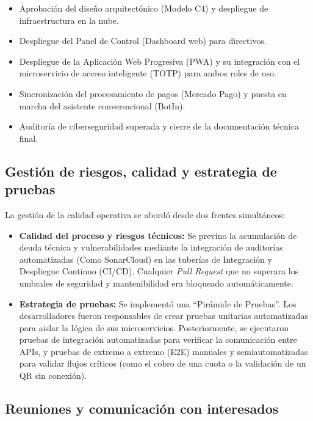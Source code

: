 \begin{itemize}
    \item Aprobación del diseño arquitectónico (Modelo C4) y despliegue de infraestructura en la nube.
    \item Despliegue del Panel de Control (Dashboard web) para directivos.
    \item Despliegue de la Aplicación Web Progresiva (PWA) y su integración con el microservicio de acceso inteligente (TOTP) para ambos roles de uso.
    \item Sincronización del procesamiento de pagos (Mercado Pago) y puesta en marcha del asistente conversacional (BotIn).
    \item Auditoría de ciberseguridad superada y cierre de la documentación técnica final.
\end{itemize}

\subsection{Gestión de riesgos, calidad y estrategia de pruebas}

La gestión de la calidad operativa se abordó desde dos frentes simultáneos:

\begin{itemize}
    \item \textbf{Calidad del proceso y riesgos técnicos:} Se previno la acumulación de deuda técnica y vulnerabilidades mediante la integración de auditorías automatizadas (Como SonarCloud) en las tuberías de Integración y Despliegue Continuo (CI/CD). Cualquier \textit{Pull Request} que no superara los umbrales de seguridad y mantenibilidad era bloqueado automáticamente.
    \item \textbf{Estrategia de pruebas:} Se implementó una ``Pirámide de Pruebas''. Los desarrolladores fueron responsables de crear pruebas unitarias automatizadas para aislar la lógica de sus microservicios. Posteriormente, se ejecutaron pruebas de integración automatizadas para verificar la comunicación entre APIs, y pruebas de extremo a extremo (E2E) manuales y semiautomatizadas para validar flujos críticos (como el cobro de una cuota o la validación de un QR sin conexión).
\end{itemize}

\subsection{Reuniones y comunicación con interesados}

